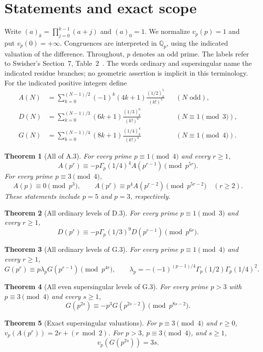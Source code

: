\documentclass[11pt,letterpaper]{article}
\newtheorem{theorem}{Theorem}[section]
\numberwithin{equation}{section}
\begin{document}
\section{Statements and exact scope}\label{loc-V-1}
Write $(a)_k=\prod_{j=0}^{k-1}(a+j)$ and $(a)_0=1$. We normalize
$v_p(p)=1$ and put $v_p(0)=+\infty$. Congruences are interpreted
in $\mathbb Q_p$, using the indicated valuation of the difference.
Throughout, $p$ denotes an odd prime.
The labels refer to Swisher's Section~7, Table~2~\cite{V-Swisher}.
The words ordinary and supersingular name the indicated residue
branches; no geometric assertion is implicit in this terminology.
For the indicated positive integers define
\begin{align*}
 A(N)&=\sum_{k=0}^{(N-1)/2}(-1)^k(4k+1)\frac{(1/2)_k^5}{(k!)^5}
 &&(N\text{ odd}),\\
 D(N)&=\sum_{k=0}^{(N-1)/3}(6k+1)\frac{(1/3)_k^6}{(k!)^6}
 &&(N\equiv1\pmod3),\\
 G(N)&=\sum_{k=0}^{(N-1)/4}(8k+1)\frac{(1/4)_k^4}{(k!)^4}
 &&(N\equiv1\pmod4).
\end{align*}
\begin{theorem}[All of A.3]
For every prime $p\equiv1\pmod4$ and every $r\ge1$,
\[
 A(p^r)\equiv-p\Gamma_p(1/4)^4 A(p^{r-1})\pmod{p^{5r}}.
\]
For every prime $p\equiv3\pmod4$,
\[
 A(p)\equiv0\pmod{p^3},\qquad
 A(p^r)\equiv p^4A(p^{r-2})\pmod{p^{5r-2}}\quad(r\ge2).
\]
These statements include $p=5$ and $p=3$, respectively.
\end{theorem}
\begin{theorem}[All ordinary levels of D.3]
For every prime $p\equiv1\pmod3$ and every $r\ge1$,
\[
 D(p^r)\equiv-p\Gamma_p(1/3)^9D(p^{r-1})\pmod{p^{6r}}.
\]
\end{theorem}
\begin{theorem}[All ordinary levels of G.3]
For every prime $p\equiv1\pmod4$ and every $r\ge1$,
\[
 G(p^r)\equiv p\lambda_pG(p^{r-1})\pmod{p^{4r}},\qquad
 \lambda_p=-(-1)^{(p-1)/4}\Gamma_p(1/2)\Gamma_p(1/4)^2.
\]
\end{theorem}
\begin{theorem}[All even supersingular levels of G.3]
For every prime $p>3$ with $p\equiv3\pmod4$ and every $s\ge1$,
\[
 G(p^{2s})\equiv-p^3G(p^{2s-2})\pmod{p^{8s-2}}.
\]
\end{theorem}
\begin{theorem}[Exact supersingular valuations]
For $p\equiv3\pmod4$ and $r\ge0$,
$v_p(A(p^r))=2r+(r\bmod2)$. For $p>3$, $p\equiv3\pmod4$,
and $s\ge1$,
\[
 v_p(G(p^{2s}))=3s.
\]
\end{theorem}
\end{document}
